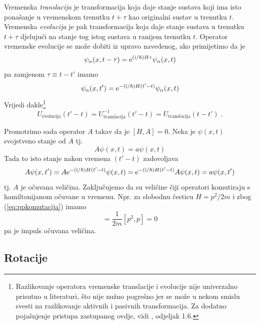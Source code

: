 Vremenska \emph{translacija} je transformacija koja daje
stanje sustava koji ima isto ponašanje u vremenskom
trenutku $t+\tau$ kao originalni sustav u trenutku $t$. Vremenska
\emph{evolucija} je pak transformacija koja 
daje stanje sustava u trenutku $t+\tau$ djelujući na stanje
tog istog sustava u ranijem trenutku $t$.
Operator vremenske evolucije se može dobiti iz upravo
navedenog, ako primijetimo da je
\begin{equation}
\psi_{\alpha}(x,t-\tau)=\textrm{e}^{(\textrm{i}/\hbar)H\tau}\psi_{\alpha}(x,t)
\end{equation}
pa zamjenom $\tau\equiv t-t'$ imamo 
\begin{equation}
\psi_{\alpha}(x,t')=\textrm{e}^{-(\textrm{i}/\hbar)H(t'-t)}\psi_{\alpha}(x,t)
\end{equation}
Vrijedi dakle\footnote{Razlikovanje operatora vremenske translacije i evolucije nije
    univerzalno prisutno u literaturi, što nije nužno pogrešno jer se može
    u nekom smislu svesti na razlikovanje aktivnih i pasivnih transformacija. 
    Za dodatno pojašnjenje pristupa zastupanog ovdje, vidi \cite{Greiner:1989},
odjeljak 1.6.}
\begin{equation}
U_{\text{evolucija}}(t' -t)=U^{-1}_{\text{translacija}}(t' -t)
=U_{\text{translacija}}(t -t') \;.
\end{equation}

Promotrimo sada operator $A$ takav da je
$[H,A]=0$. Neka je $\psi(x,t)$ svojstveno stanje od $A$ tj.
\begin{equation}
  A\psi(x,t) = a \psi(x,t)
\end{equation}
Tada to isto stanje nakon vremena $(t'-t)$ zadovoljava
\begin{equation}
  A\psi(x,t')= A \textrm{e}^{-(\textrm{i}/\hbar)H(t'-t)} \psi(x,t) =
 \textrm{e}^{-(\textrm{i}/\hbar)H(t'-t)} A \psi(x,t) = a \psi(x,t')
\end{equation}
tj. $A$ je očuvana veličina. Zaključujemo da su
veličine čiji operatori komutiraju s hamiltonijanom očuvane u vremenu.
Npr. za slobodnu česticu $H=p^2/2m$ i zbog (\ref{eq:ppkomutacija}) imamo
\begin{equation}
   [H,p]=\frac{1}{2m}[p^2,p]=0
\end{equation}
pa je impuls očuvana veličina.



\subsection{Rotacije}

